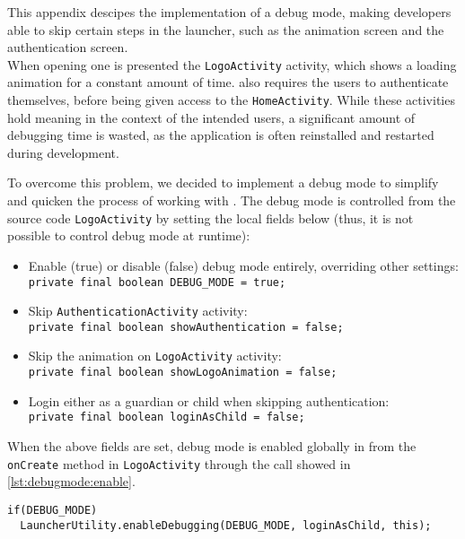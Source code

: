 This appendix descipes the implementation of a debug mode, making developers able to skip certain steps in the launcher, such as the animation screen and the authentication screen.\\

When opening \launcher one is presented the \lstinline{LogoActivity} activity, which shows a loading animation for a constant amount of time.
\launcher also requires the users to authenticate themselves, before being given access to the \lstinline{HomeActivity}.
While these activities hold meaning in the context of the intended users, a significant amount of debugging time is wasted, as the application is often reinstalled and restarted during development. 

To overcome this problem, we decided to implement a debug mode to simplify and quicken the process of working with \launcher.
The debug mode is controlled from the source code \lstinline|LogoActivity| by setting the local fields below (thus, it is not possible to control debug mode at runtime):

\begin{itemize}
\item Enable (true) or disable (false) debug mode entirely, overriding other settings:\\
\lstinline|private final boolean DEBUG_MODE = true;|
\item Skip \lstinline|AuthenticationActivity| activity:\\
\lstinline|private final boolean showAuthentication = false;|
\item Skip the animation on \lstinline|LogoActivity| activity:\\
\lstinline|private final boolean showLogoAnimation = false;|
\item Login either as a guardian or child when skipping authentication:\\
\lstinline|private final boolean loginAsChild = false;|
\end{itemize}

When the above fields are set, debug mode is enabled globally in \launcher from the \lstinline|onCreate| method in \lstinline|LogoActivity| through the call showed in \cref{lst:debugmode:enable}.

\begin{lstlisting}[caption={Enable debug mode from \lstinline|LogoActivity|.},label={lst:debugmode:enable}]  
if(DEBUG_MODE)
  LauncherUtility.enableDebugging(DEBUG_MODE, loginAsChild, this);
\end{lstlisting}

